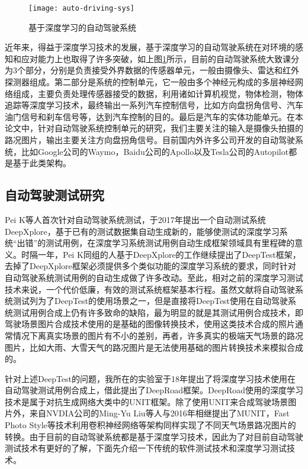 \begin{figure}[ht]
    \centering
    \texttt{[image: auto-driving-sys]}
    \caption{基于深度学习的自动驾驶系统}
    \label{auto-driving-sys}
\end{figure}

近年来，得益于深度学习技术的发展，基于深度学习的自动驾驶系统在对环境的感知和应对能力上也取得了许多突破，如上图\ref{auto-driving-sys}所示，目前的自动驾驶系统大致课分为3个部分，分别是负责接受外界数据的传感器单元，一般由摄像头、雷达和红外探测器组成。第二部分是系统的控制单元，它一般由多个神经元构成的多层神经网络组成，主要负责处理传感器接受的数据，利用诸如计算机视觉，物体检测，物体追踪等深度学习技术，最终输出一系列汽车控制信号，比如方向盘拐角信号、汽车油门信号和刹车信号等，达到汽车控制的目的。最后是汽车的实体功能单元。在本论文中，针对自动驾驶系统控制单元的研究，我们主要关注的输入是摄像头拍摄的路况图片，输出主要关注方向盘拐角信号。目前国内外许多公司开发的自动驾驶系统，比如Google公司的Waymo，Baidu公司的Apollo以及Tesla公司的Autopilot都是基于此类架构。

\subsection{自动驾驶测试研究}

Pei K\cite{DeepXplore}等人首次针对自动驾驶系统测试，于2017年提出一个自动测试系统DeepXplore，基于已有的测试数据集自动生成新的，能够使测试的深度学习系统“出错”的测试用例，在深度学习系统测试用例自动生成框架领域具有里程碑的意义。时隔一年，Pei K同组的人基于DeepXplore的工作继续提出了DeepTest\cite{DeepTest}框架，去掉了DeepXplore框架必须提供多个类似功能的深度学习系统的要求，同时针对自动驾驶系统测试用例的自动生成做了许多改动。至此，相对之前的深度学习测试技术来说，一个代价低廉，有效的测试系统框架基本行程。虽然文献\cite{DeepTest}将自动驾驶系统测试列为了DeepTest的使用场景之一，但是直接将DeepTest使用在自动驾驶系统测试用例合成上仍有许多致命的缺陷，最为明显的就是其测试用例合成技术，即驾驶场景图片合成技术使用的是基础的图像转换技术，使用这类技术合成的照片通常情况下离真实场景的图片有不小的差别，再者，许多真实的极端天气场景的路况图片，比如大雨、大雪天气的路况图片是无法使用基础的图片转换技术来模拟合成的。

针对上述DeepTest的问题，我所在的实验室于18年提出了将深度学习技术使用在自动驾驶测试用例合成上，借此提出了DeepRoad框架\cite{DeepRoad}。DeepRoad使用的深度学习技术是属于对抗生成网络大类中的UNIT\cite{UNIT}框架。除了使用UNIT来合成驾驶场景图片外，来自NVDIA公司的Ming-Yu Liu等人与2016年相继提出了MUNIT\cite{MUNIT}，Fast Photo Style\cite{fps}等技术利用卷积神经网络等架构同样实现了不同天气场景路况图片的转换。由于目前的自动驾驶系统都是基于深度学习技术，因此为了对目前自动驾驶测试技术有更好的了解，下面先介绍一下传统的软件测试技术和深度学习测试技术。

